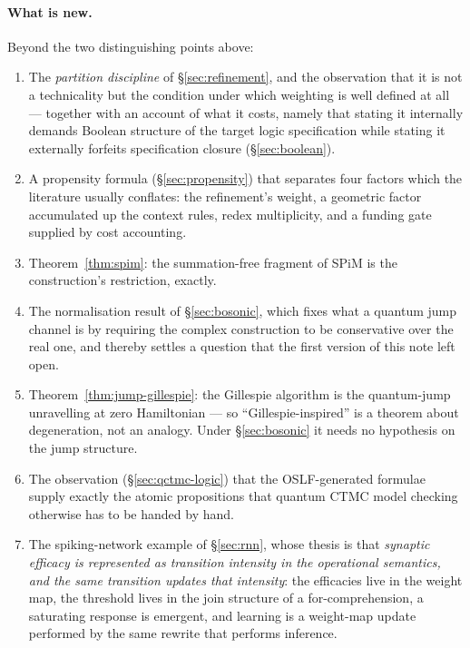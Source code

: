 \documentclass[11pt,a4paper]{article}
\theoremstyle{plain}
\theoremstyle{definition}
\theoremstyle{remark}
\begin{document}
\paragraph{What is new.} Beyond the two distinguishing points above:
\begin{enumerate}[label=(\roman*),leftmargin=2.2em]
\item The \emph{partition discipline} of \S\ref{sec:refinement}, and the observation that it is not
a technicality but the condition under which weighting is well defined at all --- together with an
account of what it costs, namely that stating it internally demands Boolean structure of the target
logic specification while stating it externally forfeits specification closure
(\S\ref{sec:boolean}).
\item A propensity formula (\S\ref{sec:propensity}) that separates four factors which the literature
usually conflates: the refinement's weight, a geometric factor accumulated up the context rules,
redex multiplicity, and a funding gate supplied by cost accounting.
\item Theorem~\ref{thm:spim}: the summation-free fragment of SPiM is the construction's restriction,
exactly.
\item The normalisation result of \S\ref{sec:bosonic}, which fixes what a quantum jump channel is by
requiring the complex construction to be conservative over the real one, and thereby settles a
question that the first version of this note left open.
\item Theorem~\ref{thm:jump-gillespie}: the Gillespie algorithm is the quantum-jump unravelling at
zero Hamiltonian --- so ``Gillespie-inspired'' is a theorem about degeneration, not an analogy. Under
\S\ref{sec:bosonic} it needs no hypothesis on the jump structure.
\item The observation (\S\ref{sec:qctmc-logic}) that the OSLF-generated formulae supply exactly the
atomic propositions that quantum CTMC model checking otherwise has to be handed by hand.
\item The spiking-network example of \S\ref{sec:rnn}, whose thesis is that \emph{synaptic efficacy is
represented as transition intensity in the operational semantics, and the same transition updates
that intensity}: the efficacies live in the weight map, the threshold lives in the join structure of
a for-comprehension, a saturating response is emergent, and learning is a weight-map update
performed by the same rewrite that performs inference.
\end{enumerate}
\end{document}
